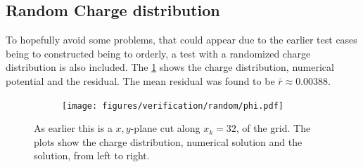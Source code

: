 		\subsection{Random Charge distribution}
			To hopefully avoid some problems, that could appear due to the earlier test
			cases being to constructed being to orderly, a test with a randomized
			charge distribution is also included. The \cref{fig:random} shows the
			charge distribution, numerical potential and the residual. The mean residual was
 			found to be \(\bar{r} \approx 0.00388\).
			\begin{figure}
				\centering
				\begin{subfigure}[b]{0.32\textwidth}
					\texttt{[image: figures/verification/random/phi.pdf]}
				\end{subfigure}
				\caption{As earlier this is a \(x,y\)-plane cut along \(x_k=32\), of the grid. The plots show the charge distribution,
				numerical solution and the solution, from left to right.}
				\label{fig:random}
			\end{figure}
%
%
%
%


